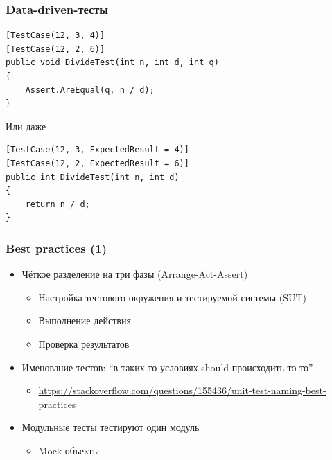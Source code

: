 \documentclass{../../slides-style}
\begin{document}
    \begin{frame}[fragile]
        \frametitle{Data-driven-тесты}
            \begin{verbatim}
[TestCase(12, 3, 4)]
[TestCase(12, 2, 6)]
public void DivideTest(int n, int d, int q)
{
    Assert.AreEqual(q, n / d);
}
        \end{verbatim}
        \vspace{3mm}
        Или даже
        \begin{verbatim}
[TestCase(12, 3, ExpectedResult = 4)]
[TestCase(12, 2, ExpectedResult = 6)]
public int DivideTest(int n, int d)
{
    return n / d;
}
        \end{verbatim}
    \end{frame}

    \begin{frame}
        \frametitle{Best practices (1)}
        \begin{itemize}
            \item Чёткое разделение на три фазы (Arrange-Act-Assert)
            \begin{itemize}
                \item Настройка тестового окружения и тестируемой системы (SUT)
                \item Выполнение действия
                \item Проверка результатов
            \end{itemize}
            \item Именование тестов: ``в таких-то условиях should происходить то-то''
            \begin{itemize}
                \item \url{https://stackoverflow.com/questions/155436/unit-test-naming-best-practices}
            \end{itemize}
            \item Модульные тесты тестируют один модуль
            \begin{itemize}
                \item Mock-объекты
            \end{itemize}
        \end{itemize}
    \end{frame}
\end{document}
